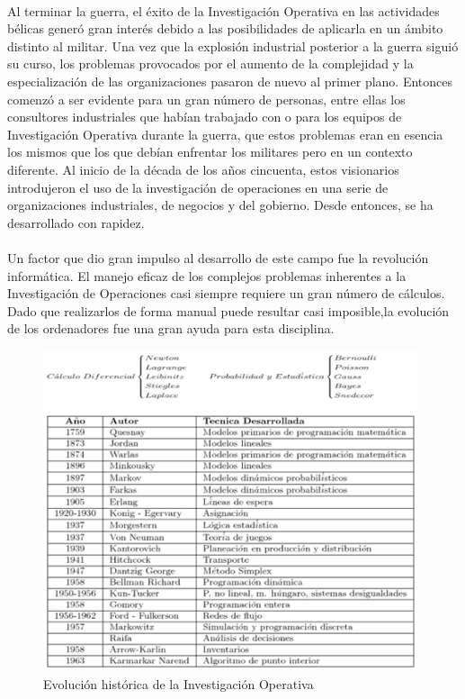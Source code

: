 \documentclass[12pt, a4paper,spanish]{article}
\begin{document}
		\paragraph{}
		Al terminar la guerra, el éxito de la Investigación Operativa en las actividades bélicas generó gran interés debido a las posibilidades de aplicarla en un ámbito distinto al militar. Una vez que la explosión industrial posterior a la guerra siguió su curso, los problemas provocados por el aumento de la complejidad y la especialización de las organizaciones pasaron de nuevo al primer plano. Entonces comenzó a ser evidente para un gran número de personas, entre ellas los consultores industriales que habían trabajado con o para los equipos de Investigación Operativa durante la guerra, que estos problemas eran en esencia los mismos que los que debían enfrentar los militares pero en un contexto diferente. Al inicio de la década de los años cincuenta, estos visionarios introdujeron el uso de la investigación de operaciones en una serie de organizaciones industriales, de negocios y del gobierno. Desde entonces, se ha desarrollado con rapidez. \cite{hillier_lieberman_IO}

		\paragraph{}
		Un factor que dio gran impulso al desarrollo de este campo fue la revolución informática. El manejo eficaz de los complejos problemas inherentes a la Investigación de Operaciones casi siempre requiere un gran número de cálculos. Dado que realizarlos de forma manual puede resultar casi imposible,la evolución de los ordenadores fue una gran ayuda para esta disciplina.	\cite{hillier_lieberman_IO}

		\begin{figure}[H]
			\centering
			\includegraphics[width=110mm]{res/desarrollo-historico-de-la-investigacion-de-operaciones.png}
			\caption{Evolución histórica de la Investigación Operativa \protect\cite{gestiopolis_IO_history}}
		\end{figure}
\end{document}
